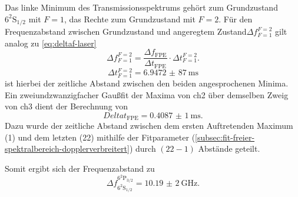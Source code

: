 \documentclass[../bericht.tex]{subfiles}
\begin{document}
        Das linke Minimum des Transmissionsspektrums geh\"ort zum Grundzustand $\mathrm{6^2S_{1/2}}$ mit $F=1$, das Rechte zum Grundzustand mit $F=2$. F\"ur den Frequenzabstand zwischen Grundzustand und angeregtem Zustand$\Delta f_{F=1}^{F=2}$ gilt analog zu \cref{eq:deltaf-laser}
        \begin{equation*}
          \Delta f_{F=1}^{F=2} = \frac{\Delta f_\mathrm{FPE}}{\Delta t_\mathrm{FPE}}\cdot \Delta t_{F=1}^{F=2}.
        \end{equation*}
        \begin{equation*}
          \Delta t_{F=1}^{F=2}= \SI{6,9472(87)}{\milli\second}
        \end{equation*}
        ist hierbei der zeitliche Abstand zwischen den beiden angesprochenen Minima. Ein zweiundzwanzigfacher Gau\ss{}fit der Maxima von ch2 \"uber demselben Zweig von ch3 dient der Berechnung von
        \begin{equation*}
          Delta t_\mathrm{FPE}=\SI{0,4087(1)}{\milli\second}.
        \end{equation*}
        Dazu wurde der zeitliche Abstand zwischen dem ersten Auftretenden Maximum (1) und dem letzten (22) mithilfe der Fitparameter (\cref{subsec:fit-freier-spektralbereich-dopplerverbreitert}) durch $(22-1)$ Abst\"ande geteilt.

        Somit ergibt sich der Frequenzabstand zu
        \begin{equation*}
          \Delta f_\mathrm{6^2S_{1/2}}^\mathrm{6^2P_{3/2}} = \SI{10,19(2)}{\giga\hertz}.
        \end{equation*}
\end{document}
